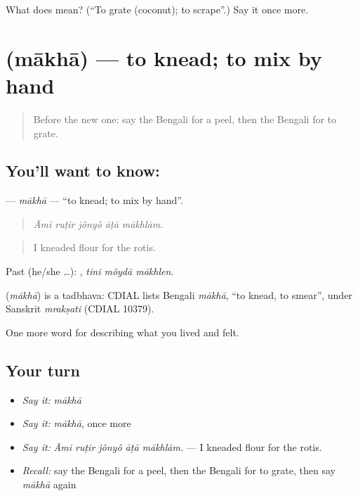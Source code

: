 \begin{tcolorbox}[breakable,colback=teal!4,colframe=teal!35!black,title={Before you move on}]
What does  mean? (\textquotedblleft{}To grate (coconut); to scrape\textquotedblright{}.) Say it once more.
\end{tcolorbox}
\section[\texorpdfstring{\bn{মাখা} (mākhā)}{মাখা (mākhā)}]{ (mākhā) — to knead; to mix by hand}

\label{lesson:BN-C513-makha}



\begin{quote}
Before the new one: say the Bengali for a peel, then the Bengali for to grate.
\end{quote}

\subsection*{You'll want to know: }
\textbf{} — \emph{mākhā} — \textquotedblleft{}to knead; to mix by hand\textquotedblright{}.

\begin{quote}
    
\end{quote}

\begin{quote}
\emph{Āmi ruṭir jônyô āṭā mākhlām.}
\end{quote}

\begin{quote}
I kneaded flour for the rotis.
\end{quote}

Past (he/she …):   , \emph{tini môydā mākhlen}.

\begin{cousinweb}
\textbf{} (\emph{mākhā}) is a tadbhava: CDIAL lists Bengali \emph{mākhā}, \textquotedblleft{}to knead, to smear\textquotedblright{}, under Sanskrit \emph{mrakṣati} (CDIAL 10379).
\end{cousinweb}

\begin{grammarlens}[title={What you've built}]
One more word for describing what you lived and felt.
\end{grammarlens}

\subsection*{Your turn}
\begin{itemize}
\raggedright
  \item \emph{Say it:} \emph{mākhā}
  \item \emph{Say it:} \emph{mākhā}, once more
  \item \emph{Say it:} \emph{Āmi ruṭir jônyô āṭā mākhlām.} — I kneaded flour for the rotis.
  \item \emph{Recall:} say the Bengali for a peel, then the Bengali for to grate, then say \emph{mākhā} again
\end{itemize}

